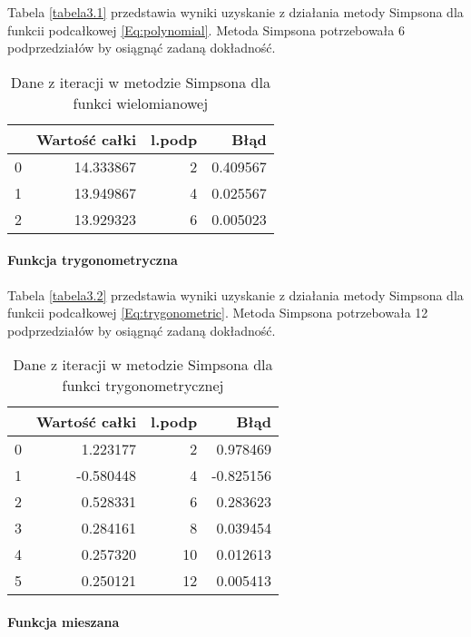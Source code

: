 \documentclass[12pt,twoside]{article}
\begin{document}
Tabela \eqref{tabela3.1} przedstawia wyniki uzyskanie z działania metody Simpsona dla funkcii podcałkowej \eqref{Eq:polynomial}. Metoda Simpsona potrzebowała 6 podprzedziałów by osiągnąć zadaną dokładność.

\begin{table}[H]
\centering 
\caption{Dane z iteracji w metodzie Simpsona dla funkci wielomianowej}
\label{tabela3.1}
\begin{tabular}{lrrr}
\toprule
{} &  Wartość całki &  l.podp &      Błąd \\
\midrule
0 &      14.333867 &       2 &  0.409567 \\
1 &      13.949867 &       4 &  0.025567 \\
2 &      13.929323 &       6 &  0.005023 \\
\bottomrule
\end{tabular}
\end{table}

\paragraph{Funkcja trygonometryczna}

Tabela \eqref{tabela3.2} przedstawia wyniki uzyskanie z działania metody Simpsona dla funkcii podcałkowej \eqref{Eq:trygonometric}. Metoda Simpsona potrzebowała 12 podprzedziałów by osiągnąć zadaną dokładność.

\begin{table}[H]
\centering
\caption{Dane z iteracji w metodzie Simpsona dla funkci trygonometrycznej}
\label{tabela3.2}
\begin{tabular}{lrrr}
\toprule
{} &  Wartość całki &  l.podp &      Błąd \\
\midrule
0 &       1.223177 &       2 &  0.978469 \\
1 &      -0.580448 &       4 & -0.825156 \\
2 &       0.528331 &       6 &  0.283623 \\
3 &       0.284161 &       8 &  0.039454 \\
4 &       0.257320 &      10 &  0.012613 \\
5 &       0.250121 &      12 &  0.005413 \\
\bottomrule
\end{tabular}
\end{table}


\paragraph{Funkcja mieszana}
\end{document}
